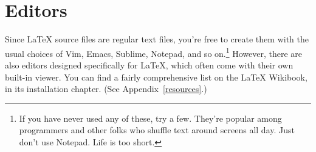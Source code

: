 \section{Editors}

Since \LaTeX{} source files are regular text files,
you're free to create them with the usual choices of Vim, Emacs,
Sublime, Notepad\plusplus, and so on.\punckern\footnote{If you have never used
any of these, try a few.
They're popular among programmers and other folks who shuffle text around
screens all day. Just don't use Notepad. Life is too short.}
However, there are also editors designed specifically for \LaTeX{},
which often come with their own built-in  viewer.
You can find a fairly comprehensive list on the \LaTeX{} Wikibook,
in its installation chapter. (See Appendix~\ref{resources}.)
